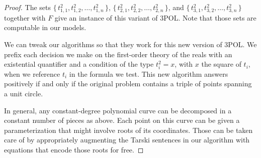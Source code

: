 \begin{proof}
	The sets
	$\{\,t_{1,1}^2,t_{1,2}^2,\ldots,t_{1,n}^2\,\}$,
	$\{\,t_{2,1}^2,t_{2,2}^2,\ldots,t_{2,n}^2\,\}$, and
	$\{\,t_{3,1}^2,t_{3,2}^2,\ldots,t_{3,n}^2\,\}$
	together with $F$ give an instance of this variant of 3POL\@.
	Note that those sets are computable in our models.

	We can tweak our algorithms so that they work for this new version of
	3POL\@. We prefix each decision we make on the first-order theory of the reals
	with an existential quantifier and a condition of the type $t_i^2=x$, with
	$x$ the square of $t_i$, when we reference $t_i$ in the formula we test.
%
	This new algorithm answers positively if and only if the original problem
	contains a triple of points spanning a unit circle.

	In general, any constant-degree polynomial curve can be decomposed in
	a constant number of pieces as above. Each point on this curve can be given a
	parameterization that might involve roots of its coordinates. Those can be
	taken care of by appropriately augmenting the Tarski sentences in our
	algorithm with equations that encode those roots for free.
\end{proof}
